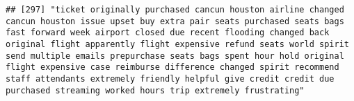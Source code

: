 \documentclass[
]{article}
\begin{document}
\begin{verbatim}
## [297] "ticket originally purchased cancun houston airline changed cancun houston issue upset buy extra pair seats purchased seats bags fast forward week airport closed due recent flooding changed back original flight apparently flight expensive refund seats world spirit send multiple emails prepurchase seats bags spent hour hold original flight expensive case reimburse difference changed spirit recommend staff attendants extremely friendly helpful give credit credit due purchased streaming worked hours trip extremely frustrating"                                                                                                                                                                                                                                                                                                                                                                                                                                                                                                                                                                                                                                                                                                                                                                                                                                                                                                                                                                                                                                                                                                                                                                                                                                               

\end{verbatim}
\end{document}
